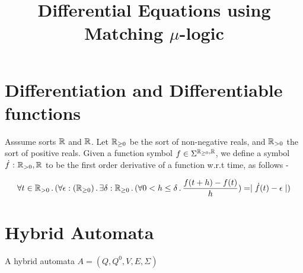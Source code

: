 \documentclass[]{article}
\title{Differential Equations using Matching $\mu$-logic}
\newcommand{\SortR}{S_{\R \rightarrow \R}}
\newcommand{\differential}{\textit{differential}}
\begin{document}
\maketitle

\section{Differentiation and Differentiable functions}

Asssume sorts $\mathbb{R}$ and $\mathbb{R}$. Let $\mathbb{R}_{\geq 0}$ be the sort of non-negative
reals, and $\mathbb{R}_{> 0}$ the sort of positive reals.
Given a function symbol $f \in \Sigma^{\mathbb{R}_{\geq 0}, \mathbb{R}}$,
we define a symbol $\dot{f} \ \mathord{:} \ \mathbb{R}_{> 0}, \mathbb{R}$ to be the first
order derivative of a function w.r.t time, as follows -


$$ \forall t \in \mathbb{R}_{> 0} \,\mathord{.}\, (\forall \epsilon : (\mathbb{R}_{\geq 0}) \,\mathord{.}\, \exists \delta :
\mathbb{R}_{\geq 0} \,\mathord{.}\, (\forall 0 < h \leq \delta \,\mathord{.}\, \frac{f(t + h) -f(t)}{h}) = \mid
\dot{f}(t) - \epsilon \mid) $$



%
%
%
%
%
%
\section{Hybrid Automata}

A hybrid automata $A = (Q,Q^0,V,E,\Sigma)$
\end{document}
